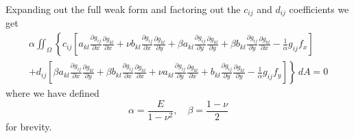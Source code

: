 \documentclass[11pt]{article}
\newcommand\p[2]{\frac{\partial #1}{\partial #2}}
\newcommand\G[6]{\p{g_{#1 #2}}{#5}\p{g_{#3 #4}}{#6}}
\begin{document}
Expanding out the full weak form and factoring out the $c_{ij}$ and $d_{ij}$ coefficients we get
\begin{multline} \label{eq:ph2}
  \alpha \iint_\Omega \left\{
    c_{ij} \left[
      a_{kl}\G{i}{j}{k}{l}{x}{x} + \nu b_{kl}\G{i}{j}{k}{l}{x}{y}
      + \beta a_{kl}\G{i}{j}{k}{l}{y}{y} + \beta b_{kl}\G{i}{j}{k}{l}{y}{x}
      - \frac{1}{\alpha}g_{ij}f_x
    \right] \right. \\ \left.
    + d_{ij} \left[
      \beta a_{kl}\G{i}{j}{k}{l}{x}{y} + \beta b_{kl}\G{i}{j}{k}{l}{x}{x}
      + \nu a_{kl}\G{i}{j}{k}{l}{y}{x} + b_{kl}\G{i}{j}{k}{l}{y}{y}
      - \frac{1}{\alpha}g_{ij}f_y
    \right]
  \right\} \, dA = 0
\end{multline}
where we have defined
\begin{equation}
  \alpha = \frac{E}{1-\nu^2}, \quad \beta = \frac{1-\nu}{2}
\end{equation}
for brevity.
\end{document}
